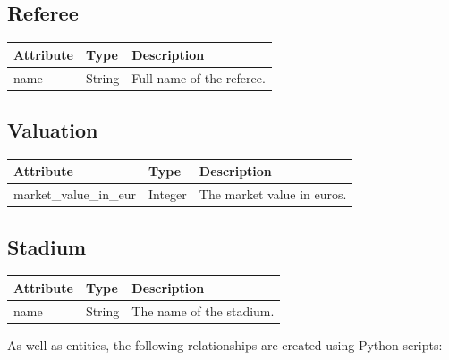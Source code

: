 \documentclass{Configuration_Files/PoliMi3i_thesis}
\begin{document}
\subsection*{Referee}
\begin{longtable}{|p{4cm}|p{3cm}|p{8cm}|}
\hline
\textbf{Attribute} & \textbf{Type} & \textbf{Description} \\
\hline
\endhead
name & String & Full name of the referee. \\
\hline
\end{longtable}

\subsection*{Valuation}
\begin{longtable}{|p{4cm}|p{3cm}|p{8cm}|}
\hline
\textbf{Attribute} & \textbf{Type} & \textbf{Description} \\
\hline
\endhead
market\_value\_in\_eur & Integer & The market value in euros. \\
\hline
\end{longtable}

\subsection*{Stadium}
\begin{longtable}{|p{4cm}|p{3cm}|p{8cm}|}
\hline
\textbf{Attribute} & \textbf{Type} & \textbf{Description} \\
\hline
\endhead
name & String & The name of the stadium. \\
\hline
\end{longtable}




\newpage
As well as entities, the following relationships are created using Python scripts:
\end{document}
